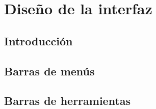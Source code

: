 \chapter{Diseño de la interfaz} \label{cap:diseño_interfaz}

 \section{Introducción}



\section{Barras de menús}


  

\section{Barras de herramientas}


